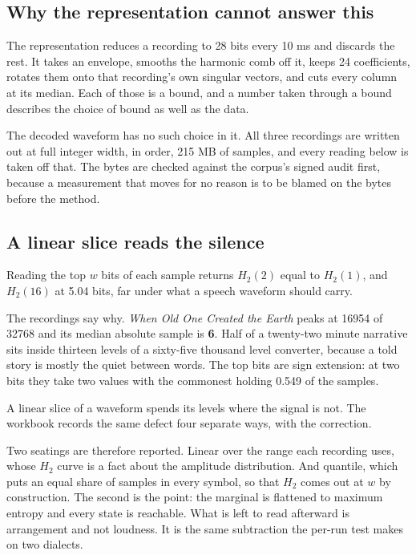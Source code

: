 \subsection{Why the representation cannot answer this}

The representation reduces a recording to 28 bits every 10 ms and discards the rest. It takes an
envelope, smooths the harmonic comb off it, keeps 24 coefficients, rotates them onto that
recording's own singular vectors, and cuts every column at its median. Each of those is a bound, and
a number taken through a bound describes the choice of bound as well as the data.

The decoded waveform has no such choice in it. All three recordings are written out at full integer
width, in order, 215 MB of samples, and every reading below is taken off that. The bytes are checked
against the corpus's signed audit first, because a measurement that moves for no reason is to be
blamed on the bytes before the method.

\subsection{A linear slice reads the silence}

Reading the top \(w\) bits of each sample returns \(H_2(2)\) equal to \(H_2(1)\), and \(H_2(16)\) at
5.04 bits, far under what a speech waveform should carry.

The recordings say why. \emph{When Old One Created the Earth} peaks at 16954 of 32768 and its median
absolute sample is \textbf{6}. Half of a twenty-two minute narrative sits inside thirteen levels of a
sixty-five thousand level converter, because a told story is mostly the quiet between words. The top
bits are sign extension: at two bits they take two values with the commonest holding 0.549 of the
samples.

A linear slice of a waveform spends its levels where the signal is not. The workbook records the
same defect four separate ways, with the correction.

Two seatings are therefore reported. Linear over the range each recording uses, whose \(H_2\) curve
is a fact about the amplitude distribution. And quantile, which puts an equal share of samples in
every symbol, so that \(H_2\) comes out at \(w\) by construction. The second is the point: the
marginal is flattened to maximum entropy and every state is reachable. What is left to read
afterward is arrangement and not loudness. It is the same subtraction the per-run test makes on two
dialects.

